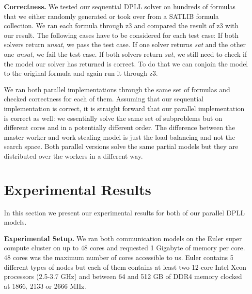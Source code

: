 \documentclass[letterpaper]{article}
\newcommand{\mypar}[1]{{\bf #1.}}
\begin{document}
\mypar{Correctness}
We tested our sequential DPLL solver on hundreds of formulas that we either randomly generated or took over from a SATLIB formula collection. \cite{cnf_website}
We ran each formula through z3 \cite{z3} and compared the result of z3 with our result.
The following cases have to be considered for each test case:
If both solvers return \textit{unsat}, we pass the test case.
If one solver returns \textit{sat} and the other one \textit{unsat}, we fail the test case.
If both solvers return \textit{sat}, we still need to check if the model our solver has returned is correct.
To do that we can conjoin the model to the original formula and again run it through z3.

We ran both parallel implementations through the same set of formulas and checked correctness for each of them.
Assuming that our sequential implementation is correct, it is straight forward that our parallel implementation is correct as well:
we essentially solve the same set of subproblems but on different cores and in a potentially different order.
The difference between the master worker and work stealing model is just the load balancing and not the search space.
Both parallel versions solve the same partial models but they are distributed over the workers in a different way.

\section{Experimental Results}\label{sec:exp}
In this section we present our experimental results for both of our parallel DPLL models.

\mypar{Experimental Setup}
We ran both communication models on the Euler super compute cluster \cite{euler} on up to 48 cores and requested 1 Gigabyte of memory per core.
48 cores was the maximum number of cores accessible to us.
Euler contains 5 different types of nodes but each of them contains at least two 12-core Intel Xeon processors (2.5-3.7 GHz) and between 64 and 512 GB of DDR4 memory clocked at 1866, 2133 or 2666 MHz.
\end{document}
